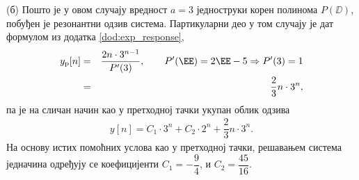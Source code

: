 (б) Пошто је у овом случају вредност $a = 3$ једноструки корен полинома $P(\DD)$, побуђен је резонантни 
одзив система. Партикуларни део у том случају је дат формулом из додатка 
\ref{dod:exp_response},
\begin{eqnarray}
    y_{\rm p}[n] &=& \dfrac{ 2 n \cdot 3^{n-1} }{ P'(3) }, \qquad P'(\EE) = 2\EE - 5 \Rightarrow P'(3) = 1 \\
                 &=& \dfrac{2}{3}n \cdot 3^n,
\end{eqnarray}
па је на сличан начин као у претходној тачки укупан облик одзива 
\begin{eqnarray}
    y[n] = C_1 \cdot 3^n + C_2 \cdot 2^n + \dfrac{2}{3}n \cdot 3^{n}.
\end{eqnarray}
На основу истих помоћних услова као у претходној тачки, решавањем система једначина одређују се коефицијенти 
$C_1 = - \dfrac{9}{4}$, и $C_2 = \dfrac{45}{16}$.
